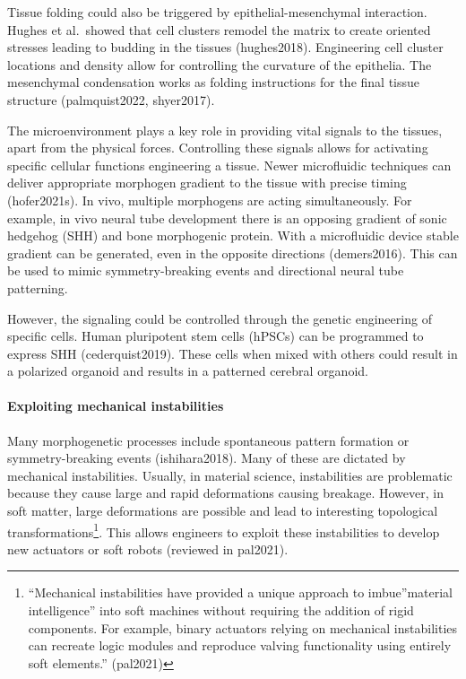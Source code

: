 \documentclass[
]{article}
\begin{document}
Tissue folding could also be triggered by epithelial-mesenchymal
interaction. Hughes et al.~showed that cell clusters remodel the matrix
to create oriented stresses leading to budding in the tissues
(hughes2018). Engineering cell cluster locations and density allow for
controlling the curvature of the epithelia. The mesenchymal condensation
works as folding instructions for the final tissue structure
(palmquist2022, shyer2017).

The microenvironment plays a key role in providing vital signals to the
tissues, apart from the physical forces. Controlling these signals
allows for activating specific cellular functions engineering a tissue.
Newer microfluidic techniques can deliver appropriate morphogen gradient
to the tissue with precise timing (hofer2021s). In vivo, multiple
morphogens are acting simultaneously. For example, in vivo neural tube
development there is an opposing gradient of sonic hedgehog (SHH) and
bone morphogenic protein. With a microfluidic device stable gradient can
be generated, even in the opposite directions (demers2016). This can be
used to mimic symmetry-breaking events and directional neural tube
patterning.

However, the signaling could be controlled through the genetic
engineering of specific cells. Human pluripotent stem cells (hPSCs) can
be programmed to express SHH (cederquist2019). These cells when mixed
with others could result in a polarized organoid and results in a
patterned cerebral organoid.

\hypertarget{exploiting-mechanical-instabilities}{%
\paragraph{Exploiting mechanical
instabilities}\label{exploiting-mechanical-instabilities}}

Many morphogenetic processes include spontaneous pattern formation or
symmetry-breaking events (ishihara2018). Many of these are dictated by
mechanical instabilities. Usually, in material science, instabilities
are problematic because they cause large and rapid deformations causing
breakage. However, in soft matter, large deformations are possible and
lead to interesting topological transformations\footnote{``Mechanical
  instabilities have provided a unique approach to imbue''material
  intelligence'' into soft machines without requiring the addition of
  rigid components. For example, binary actuators relying on mechanical
  instabilities can recreate logic modules and reproduce valving
  functionality using entirely soft elements.'' (pal2021)}. This allows
engineers to exploit these instabilities to develop new actuators or
soft robots (reviewed in pal2021).
\end{document}
